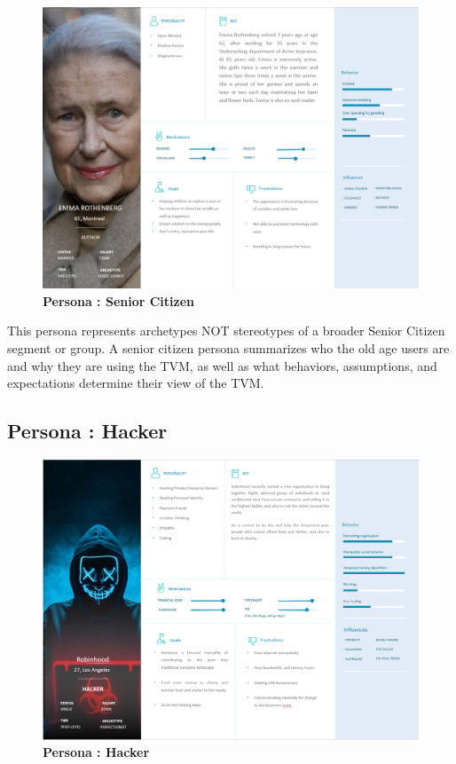 \documentclass[15pt]{article}
\begin{document}
\begin{figure}[H]
\centering
\includegraphics[width=1\textwidth]{Persona2.PNG}\par\vspace{0.1cm}
\caption{\Large\bfseries{Persona : Senior Citizen}}
\label{Persona : Senior Citizen:do}
\end{figure}


This persona represents archetypes NOT stereotypes of a broader Senior Citizen segment or group. A senior citizen persona summarizes who the old age users are and why they are using the TVM, as well as what behaviors, assumptions, and expectations determine their view of the TVM.
\subsection{Persona : Hacker}
\vspace{0.5cm}

\begin{figure}[H]
\centering
\includegraphics[width=1\textwidth]{Persona3.PNG}\par\vspace{0.1cm}
\caption{\Large\bfseries{Persona : Hacker}}
\label{Persona : Hacker:do}
\end{figure}
\end{document}
